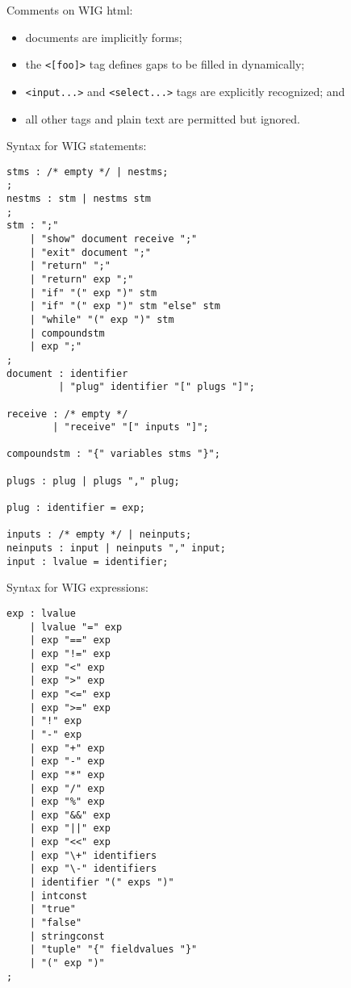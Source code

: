 \begin{slide*}
Comments on WIG html:
\begin{itemize}
\item documents are implicitly forms;
\item the \verb:<[foo]>: tag defines gaps to be filled in dynamically;
\item {\tt <input...>} and {\tt <select...>} tags are explicitly recognized; and
\item all other tags and plain text are permitted but ignored.
\end{itemize}
\vfil
\end{slide*}
 
\begin{slide*}
Syntax for WIG statements:
 
\begin{scriptsize}
\begin{verbatim}
stms : /* empty */ | nestms;
;
nestms : stm | nestms stm
;
stm : ";"
    | "show" document receive ";"
    | "exit" document ";"
    | "return" ";"
    | "return" exp ";"
    | "if" "(" exp ")" stm
    | "if" "(" exp ")" stm "else" stm
    | "while" "(" exp ")" stm
    | compoundstm
    | exp ";"
;
document : identifier
         | "plug" identifier "[" plugs "]";

receive : /* empty */
        | "receive" "[" inputs "]";

compoundstm : "{" variables stms "}";

plugs : plug | plugs "," plug;

plug : identifier = exp;

inputs : /* empty */ | neinputs;
neinputs : input | neinputs "," input;
input : lvalue = identifier;
\end{verbatim}
\end{scriptsize}
\vfil
\end{slide*}
 
\begin{slide*}
Syntax for WIG expressions:
 
\begin{scriptsize}
\begin{verbatim}
exp : lvalue
    | lvalue "=" exp
    | exp "==" exp
    | exp "!=" exp
    | exp "<" exp
    | exp ">" exp
    | exp "<=" exp
    | exp ">=" exp
    | "!" exp
    | "-" exp
    | exp "+" exp
    | exp "-" exp
    | exp "*" exp
    | exp "/" exp
    | exp "%" exp
    | exp "&&" exp
    | exp "||" exp
    | exp "<<" exp
    | exp "\+" identifiers
    | exp "\-" identifiers         
    | identifier "(" exps ")"
    | intconst
    | "true"
    | "false"
    | stringconst
    | "tuple" "{" fieldvalues "}"
    | "(" exp ")"                 
;
\end{verbatim}
\end{scriptsize}
\vfil
\end{slide*}


